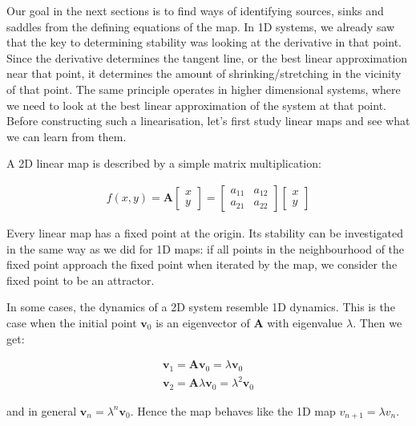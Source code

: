 Our goal in the next sections is to find ways of identifying sources, sinks and saddles from the defining equations of the map. In 1D systems, we already saw that the key to determining stability was looking at the derivative in that point. Since the derivative determines the tangent line, or the best linear approximation near that point, it determines the amount of shrinking/stretching in the vicinity of that point. The same principle operates in higher dimensional systems, where we need to look at the best linear approximation of the system at that point. Before constructing such a linearisation, let's first study linear maps and see what we can learn from them.

\pagebreak


A 2D linear map is described by a simple matrix multiplication:

\begin{gather}
f(x,y) = {\mathbf A} 
\begin{bmatrix}
x \\
y
\end{bmatrix}
=
\begin{bmatrix}
a_{11} & a_{12} \\
a_{21} & a_{22}
\end{bmatrix}
\begin{bmatrix}
x \\
y
\end{bmatrix}
\end{gather} 

Every linear map has a fixed point at the origin. Its stability can be investigated in the same way as we did for 1D maps: if all points in the neighbourhood of the fixed point approach the fixed point when iterated by the map, we consider the fixed point to be an attractor.

In some cases, the dynamics of a 2D system resemble 1D dynamics. This is the case when the initial point ${\mathbf v_0}$ is an eigenvector of ${\mathbf A}$ with eigenvalue $\lambda$. Then we get:

\begin{gather}
{\mathbf v_1} = {\mathbf A}{\mathbf v_0} = \lambda {\mathbf v_0} \\
{\mathbf v_2} = {\mathbf A}\lambda {\mathbf v_0} = \lambda^2 {\mathbf v_0} 
\end{gather} 

and in general ${\mathbf v_n} = \lambda^n {\mathbf v_0}$. Hence the map behaves like the 1D map $v_{n+1} = \lambda v_n$.

